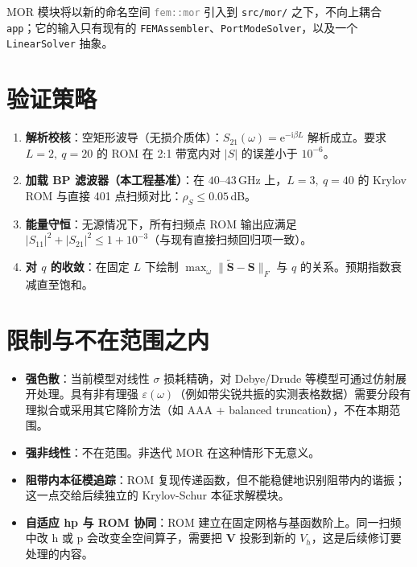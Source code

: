 \documentclass[11pt,a4paper]{ctexart}
\newcommand{\im}{\mathrm{i}}
\begin{document}
MOR 模块将以新的命名空间 \textcolor{gray}{\texttt{fem::mor}} 引入到 \texttt{src/mor/} 之下，不向上耦合 \texttt{app}；它的输入只有现有的 \texttt{FEMAssembler}、\texttt{PortModeSolver}，以及一个 \texttt{LinearSolver} 抽象。

\section{验证策略}

\begin{enumerate}
\item \textbf{解析校核}：空矩形波导（无损介质体）：$S_{21}(\omega)=\mathrm{e}^{-\im\beta L}$ 解析成立。要求 $L=2,\ q=20$ 的 ROM 在 2:1 带宽内对 $|S|$ 的误差小于 $10^{-6}$。
\item \textbf{加载 BP 滤波器（本工程基准）}：在 $40$--$43$\,GHz 上，$L=3,\ q=40$ 的 Krylov ROM 与直接 401 点扫频对比：$\rho_S \le 0.05$\,dB。
\item \textbf{能量守恒}：无源情况下，所有扫频点 ROM 输出应满足 $|S_{11}|^2+|S_{21}|^2 \le 1+10^{-3}$（与现有直接扫频回归项一致）。
\item \textbf{对 $q$ 的收敛}：在固定 $L$ 下绘制 $\max_\omega \|\widetilde{\bm S}-\bm S\|_F$ 与 $q$ 的关系。预期指数衰减直至饱和。
\end{enumerate}

\section{限制与不在范围之内}

\begin{itemize}
\item \textbf{强色散}：当前模型对线性 $\sigma$ 损耗精确，对 Debye/Drude 等模型可通过仿射展开处理。具有非有理强 $\varepsilon(\omega)$（例如带尖锐共振的实测表格数据）需要分段有理拟合或采用其它降阶方法（如 AAA + balanced truncation），不在本期范围。
\item \textbf{强非线性}：不在范围。非迭代 MOR 在这种情形下无意义。
\item \textbf{阻带内本征模追踪}：ROM 复现传递函数，但不能稳健地识别阻带内的谐振；这一点交给后续独立的 Krylov-Schur 本征求解模块。
\item \textbf{自适应 hp 与 ROM 协同}：ROM 建立在固定网格与基函数阶上。同一扫频中改 h 或 p 会改变全空间算子，需要把 $\bm V$ 投影到新的 $V_h$，这是后续修订要处理的内容。
\end{itemize}
\end{document}

